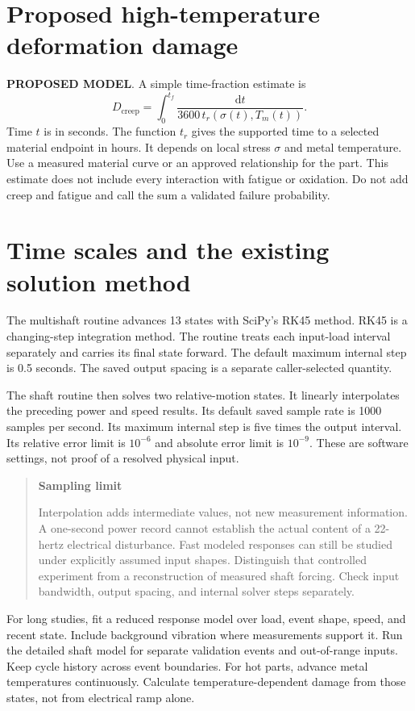\documentclass[11pt,a4paper]{report}
\newcommand{\dd}{\mathrm{d}}
\newcommand{\proposed}{\textbf{\textcolor{reportblue}{PROPOSED MODEL}}}
\newenvironment{warningbox}[1]{\begin{quote}\color{reportamber}\textbf{#1}\par\normalcolor}{\end{quote}}
\begin{document}
\section{Proposed high-temperature deformation damage}
\proposed. A simple time-fraction estimate is
\begin{equation}
D_{\mathrm{creep}}=\int_0^{t_f}
\frac{\dd t}{3600\,t_r(\sigma(t),T_m(t))}.
\end{equation}
Time $t$ is in seconds.
The function $t_r$ gives the supported time to a selected material endpoint in hours.
It depends on local stress $\sigma$ and metal temperature.
Use a measured material curve or an approved relationship for the part.
This estimate does not include every interaction with fatigue or oxidation.
Do not add creep and fatigue and call the sum a validated failure probability.

\section{Time scales and the existing solution method}
The multishaft routine advances 13 states with SciPy's RK45 method.
RK45 is a changing-step integration method.
The routine treats each input-load interval separately and carries its final state forward.
The default maximum internal step is 0.5 seconds.
The saved output spacing is a separate caller-selected quantity.

The shaft routine then solves two relative-motion states.
It linearly interpolates the preceding power and speed results.
Its default saved sample rate is 1000 samples per second.
Its maximum internal step is five times the output interval.
Its relative error limit is $10^{-6}$ and absolute error limit is $10^{-9}$.
These are software settings, not proof of a resolved physical input.

\begin{warningbox}{Sampling limit}
Interpolation adds intermediate values, not new measurement information.
A one-second power record cannot establish the actual content of a 22-hertz electrical disturbance.
Fast modeled responses can still be studied under explicitly assumed input shapes.
Distinguish that controlled experiment from a reconstruction of measured shaft forcing.
Check input bandwidth, output spacing, and internal solver steps separately.
\end{warningbox}

For long studies, fit a reduced response model over load, event shape, speed, and recent state.
Include background vibration where measurements support it.
Run the detailed shaft model for separate validation events and out-of-range inputs.
Keep cycle history across event boundaries.
For hot parts, advance metal temperatures continuously.
Calculate temperature-dependent damage from those states, not from electrical ramp alone.
\end{document}
